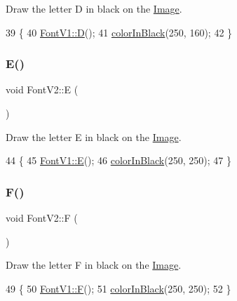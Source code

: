 Draw the letter D in black on the \mbox{\hyperlink{class_image}{Image}}. 


\begin{DoxyCode}
39                \{
40     \mbox{\hyperlink{class_font_v1_a3f4558aabfef6e0783c2294aecf215d0}{FontV1::D}}();
41     \mbox{\hyperlink{class_font_v2_a04f2501961bc286ce70fbb6a840b0e8a}{colorInBlack}}(250, 160);
42 \}
\end{DoxyCode}
\mbox{\label{class_font_v2_a3dc7a171c913a94b688689c69abafeca}} 
\subsubsection{\texorpdfstring{E()}{E()}}
{\footnotesize\ttfamily void Font\+V2\+::E (\begin{DoxyParamCaption}{ }\end{DoxyParamCaption})}



Draw the letter E in black on the \mbox{\hyperlink{class_image}{Image}}. 


\begin{DoxyCode}
44                \{
45     \mbox{\hyperlink{class_font_v1_ab8a34299af7a36cfd94c2691b579a0fa}{FontV1::E}}();
46     \mbox{\hyperlink{class_font_v2_a04f2501961bc286ce70fbb6a840b0e8a}{colorInBlack}}(250, 250);
47 \}
\end{DoxyCode}
\mbox{\label{class_font_v2_a061b1fab86aa9bae29fb7460a6ea6401}} 
\subsubsection{\texorpdfstring{F()}{F()}}
{\footnotesize\ttfamily void Font\+V2\+::F (\begin{DoxyParamCaption}{ }\end{DoxyParamCaption})}



Draw the letter F in black on the \mbox{\hyperlink{class_image}{Image}}. 


\begin{DoxyCode}
49                \{
50     \mbox{\hyperlink{class_font_v1_a40dd925bee9092d13ba1a00546cc7160}{FontV1::F}}();
51     \mbox{\hyperlink{class_font_v2_a04f2501961bc286ce70fbb6a840b0e8a}{colorInBlack}}(250, 250);
52 \}
\end{DoxyCode}
\mbox{\label{class_font_v2_a27ece9cc80af5c5d32cad07f00ed714c}} 
